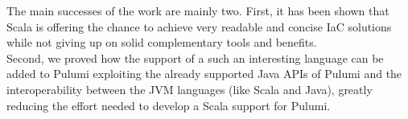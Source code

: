 \newline
The main successes of the work are mainly two.
First, it has been shown that Scala is offering the chance to achieve very readable and concise IaC solutions while not giving up on solid complementary tools and benefits.\\
Second, we proved how the support of a such an interesting language can be added to Pulumi exploiting the already supported Java APIs of Pulumi and the interoperability between the JVM languages (like Scala and Java), greatly reducing the effort needed to develop a Scala support for Pulumi.




